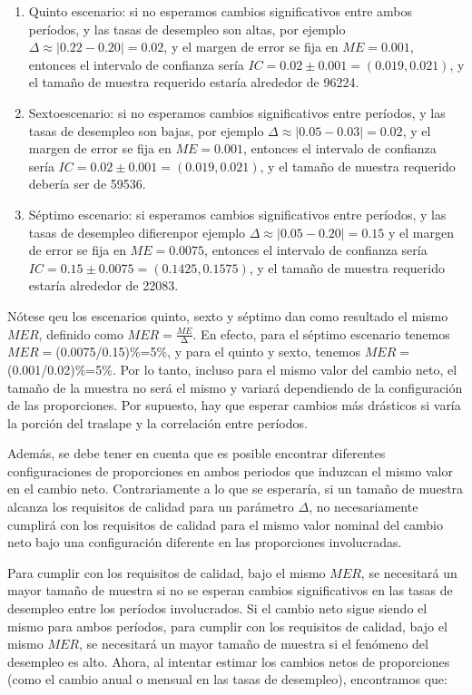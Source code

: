 \documentclass[
  12pt,
  spanish,
]{book}
\begin{document}
\begin{enumerate}
\def\labelenumi{\arabic{enumi}.}
\setcounter{enumi}{4}
\item
  Quinto escenario: si no esperamos cambios significativos entre ambos períodos, y las tasas de desempleo son altas, por ejemplo \(\Delta \approx |0.22-0.20|=0.02\), y el margen de error se fija en \(ME = 0.001\), entonces el intervalo de confianza sería \(IC=0.02 \pm 0.001=(0.019,0.021)\), y el tamaño de muestra requerido estaría alrededor de 96224.
\item
  Sextoescenario: si no esperamos cambios significativos entre períodos, y las tasas de desempleo son bajas, por ejemplo \(\Delta \approx |0.05-0.03| =0.02\), y el margen de error se fija en \(ME = 0.001\), entonces el intervalo de confianza sería \(IC=0.02\pm0.001=(0.019,0.021)\), y el tamaño de muestra requerido debería ser de 59536.
\item
  Séptimo escenario: si esperamos cambios significativos entre períodos, y las tasas de desempleo difierenpor ejemplo \(\Delta \approx|0.05-0.20|=0.15\) y el margen de error se fija en \(ME = 0.0075\), entonces el intervalo de confianza sería \(IC=0.15\pm0.0075=(0.1425,0.1575)\), y el tamaño de muestra requerido estaría alrededor de 22083.
\end{enumerate}

Nótese qeu los escenarios quinto, sexto y séptimo dan como resultado el mismo \(MER\), definido como
\(MER=\frac{ME}{\mathrm{\Delta}}\). En efecto, para el séptimo escenario tenemos \(MER=\)(0.0075/0.15)\%=5\%, y para el quinto y sexto, tenemos \(MER=\)(0.001/0.02)\%=5\%. Por lo tanto, incluso para el mismo valor del cambio neto, el tamaño de la muestra no será el mismo y variará dependiendo de la configuración de las proporciones. Por supuesto, hay que esperar cambios más drásticos si varía la porción del traslape y la correlación entre períodos.

Además, se debe tener en cuenta que es posible encontrar diferentes configuraciones de proporciones en ambos periodos que induzcan el mismo valor en el cambio neto. Contrariamente a lo que se esperaría, si un tamaño de muestra alcanza los requisitos de calidad para un parámetro \(\Delta\), no necesariamente cumplirá con los requisitos de calidad para el mismo valor nominal del cambio neto bajo una configuración diferente en las proporciones involucradas.

Para cumplir con los requisitos de calidad, bajo el mismo \(MER\), se necesitará un mayor tamaño de muestra si no se esperan cambios significativos en las tasas de desempleo entre los períodos involucrados. Si el cambio neto sigue siendo el mismo para ambos períodos, para cumplir con los requisitos de calidad, bajo el mismo \(MER\), se necesitará un mayor tamaño de muestra si el fenómeno del desempleo es alto. Ahora, al intentar estimar los cambios netos de proporciones (como el cambio anual o mensual en las tasas de desempleo), encontramos que:
\end{document}

